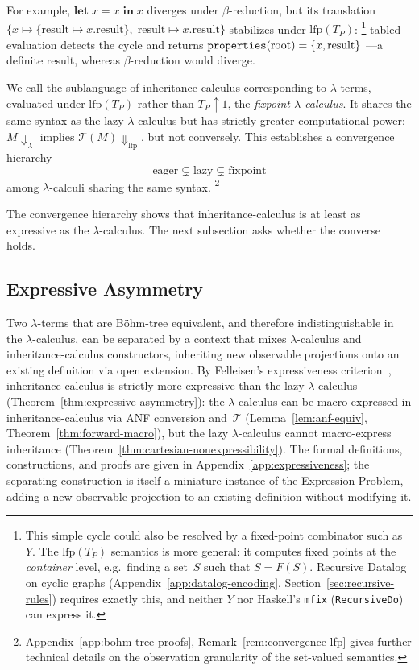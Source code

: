 For example,
$\mathbf{let}\; x = x \;\mathbf{in}\; x$
diverges under $\beta$-reduction, but its translation
$\{x \mapsto \{\mathrm{result} \mapsto x.\mathrm{result}\},\;
\mathrm{result} \mapsto x.\mathrm{result}\}$
stabilizes under $\mathrm{lfp}(T_P)$:%
\footnote{
  This simple cycle could also be resolved by a
  fixed-point combinator such as~$Y$.
  The $\mathrm{lfp}(T_P)$ semantics is more general:
  it computes fixed points at the \emph{container} level,
  e.g.\ finding a set~$S$ such that $S = F(S)$.
  Recursive Datalog on cyclic graphs
  (Appendix~\ref{app:datalog-encoding},
  Section~\ref{sec:recursive-rules}) requires exactly this,
  and neither $Y$ nor Haskell's \texttt{mfix}
  (\texttt{RecursiveDo}) can express it.
}
tabled evaluation detects the cycle and returns
$\mathtt{properties}(\mathrm{root}) = \{x, \mathrm{result}\}$
---a definite result,
whereas $\beta$-reduction would diverge.

We call the sublanguage of inheritance-calculus corresponding
to $\lambda$-terms, evaluated under $\mathrm{lfp}(T_P)$ rather than
$T_P\!\uparrow\!1$, the \emph{fixpoint $\lambda$-calculus}.
It shares the same syntax as the lazy $\lambda$-calculus but
has strictly greater computational power:
$M{\Downarrow}_\lambda$ implies
$\mathcal{T}(M){\Downarrow}_{\mathrm{lfp}}$,
but not conversely.
This establishes a convergence hierarchy
\begin{equation}\label{eq:convergence-hierarchy}
  \text{eager} \subsetneq \text{lazy} \subsetneq \text{fixpoint}
\end{equation}
among $\lambda$-calculi sharing the same syntax.%
\footnote{
  Appendix~\ref{app:bohm-tree-proofs},
  Remark~\ref{rem:convergence-lfp} gives further
  technical details on the observation granularity
  of the set-valued semantics.
}

The convergence hierarchy shows that inheritance-calculus is
at least as expressive as the $\lambda$-calculus.
The next subsection asks whether the converse holds.

\subsection{Expressive Asymmetry}
\label{sec:asymmetry}
\label{sec:formal-separation}
Two $\lambda$-terms that are B\"ohm-tree equivalent,
and therefore indistinguishable in the $\lambda$-calculus,
can be
separated by a context that mixes $\lambda$-calculus and
inheritance-calculus constructors, inheriting new observable
projections onto an existing definition via open extension.
By Felleisen's expressiveness
criterion~\cite{felleisen1991-expressive-power}, inheritance-calculus is
strictly more expressive than the lazy $\lambda$-calculus
(Theorem~\ref{thm:expressive-asymmetry}):
the $\lambda$-calculus can be macro-expressed in
inheritance-calculus via ANF conversion
and~$\mathcal{T}$
(Lemma~\ref{lem:anf-equiv}, Theorem~\ref{thm:forward-macro}),
but the lazy $\lambda$-calculus cannot macro-express inheritance
(Theorem~\ref{thm:cartesian-nonexpressibility}).
The formal definitions, constructions, and proofs are given in
Appendix~\ref{app:expressiveness};
the separating construction is itself a miniature instance of
the Expression Problem, adding a new observable projection to
an existing definition without modifying it.

